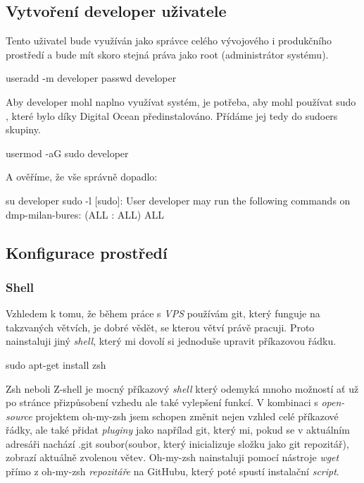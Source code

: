 \documentclass[12pt,a4paper]{report}
\begin{document}
  \subsection{Vytvoření developer uživatele}
  Tento uživatel bude využíván jako správce celého vývojového i produkčního prostředí a bude mít skoro stejná
  práva jako root (administrátor systému). \\
  \begin{bash}
    useradd -m developer
    passwd developer
  \end{bash}
  Aby developer mohl naplno využívat systém, je potřeba, aby mohl používat sudo , které bylo díky
  Digital Ocean předinstalováno. Přídáme jej tedy do sudoers skupiny.\\
  \begin{bash}
    usermod -aG sudo developer
  \end{bash}
  \clearpage
  A ověříme, že vše správně dopadlo:\\
  \begin{bash}
   su developer
   sudo -l
   [sudo]:
   User developer may run the following commands on dmp-milan-bures:
   (ALL : ALL) ALL
  \end{bash}


  \subsection{Konfigurace prostředí}
  \subsubsection{Shell}
  Vzhledem k tomu, že během práce s \emph{VPS} používám git, který funguje na takzvaných větvích, je dobré vědět, se kterou větví právě pracuji.
  Proto nainstaluji jiný \emph{shell}, který mi dovolí si jednoduše upravit příkazovou řádku.
  \begin{bash}
    sudo apt-get install zsh
  \end{bash}
  Zsh neboli Z-shell je mocný příkazový \emph{shell} který odemyká mnoho možností ať už po stránce přizpůsobení vzhedu ale také vylepšení funkcí.
  V kombinaci s \emph{open-source} projektem oh-my-zsh jsem schopen změnit nejen vzhled celé příkazové řádky, ale také přidat \emph{pluginy} jako napřílad 
  git, který mi, pokud se v aktuálním adresáři nachází .git soubor(soubor, který inicializuje složku jako git repozitář), zobrazí aktuálně zvolenou 
  větev. Oh-my-zsh nainstaluji pomocí nástroje \emph{wget} přímo z oh-my-zsh \emph{repozitáře} na GitHubu, který poté spustí instalační \emph{script}.
  
\end{document}
